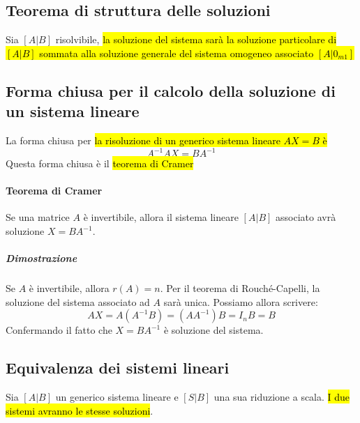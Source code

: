 \subsection{Teorema di struttura delle soluzioni}
Sia $[A|B]$ risolvibile, \hl{la soluzione del sistema sarà la soluzione particolare di
$[A|B]$ sommata alla soluzione generale del sistema omogeneo associato $[A|0_{m1}]$}

\subsection{Forma chiusa per il calcolo della soluzione di un sistema lineare}
La forma chiusa per \hl{la risoluzione di un generico sistema lineare $AX = B$ è}
\[
    A^{-1}AX = BA^{-1}
\]
Questa forma chiusa è il \hl{teorema di Cramer}

\paragraph{Teorema di Cramer} Se una matrice $A$ è invertibile, allora il
sistema lineare $[A|B]$ associato avrà soluzione $X = BA^{-1}$.

\subparagraph{Dimostrazione} Se $A$ è invertibile, allora $r(A) = n$. Per il
teorema di Rouché-Capelli, la soluzione del sistema associato ad $A$ sarà unica.
Possiamo allora scrivere:
\[
    AX = A(A^{-1}B) = (AA^{-1})B = I_n B = B
\]
Confermando il fatto che $X = BA^{-1}$ è soluzione del sistema.

\subsection{Equivalenza dei sistemi lineari}
Sia $[A|B]$ un generico sistema lineare e $[S|B]$ una sua riduzione a scala.
\hl{I due sistemi avranno le stesse soluzioni}.

